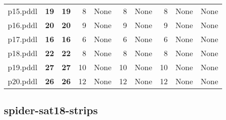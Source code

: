 \documentclass{article}
\begin{document}
\begin{tabular}{@{}lrrrrrrrrr@{}}
p15.pddl & \textbf{19} & \textbf{19} & 8 & \multicolumn{1}{|l|}{None} & 8 & \multicolumn{1}{|l|}{None} & 8 & \multicolumn{1}{|l|}{None} & \multicolumn{1}{|l|}{None} \\
p16.pddl & \textbf{20} & \textbf{20} & 9 & \multicolumn{1}{|l|}{None} & 9 & \multicolumn{1}{|l|}{None} & 9 & \multicolumn{1}{|l|}{None} & \multicolumn{1}{|l|}{None} \\
p17.pddl & \textbf{16} & \textbf{16} & 6 & \multicolumn{1}{|l|}{None} & 6 & \multicolumn{1}{|l|}{None} & 6 & \multicolumn{1}{|l|}{None} & \multicolumn{1}{|l|}{None} \\
p18.pddl & \textbf{22} & \textbf{22} & 8 & \multicolumn{1}{|l|}{None} & 8 & \multicolumn{1}{|l|}{None} & 8 & \multicolumn{1}{|l|}{None} & \multicolumn{1}{|l|}{None} \\
p19.pddl & \textbf{27} & \textbf{27} & 10 & \multicolumn{1}{|l|}{None} & 10 & \multicolumn{1}{|l|}{None} & 10 & \multicolumn{1}{|l|}{None} & \multicolumn{1}{|l|}{None} \\
p20.pddl & \textbf{26} & \textbf{26} & 12 & \multicolumn{1}{|l|}{None} & 12 & \multicolumn{1}{|l|}{None} & 12 & \multicolumn{1}{|l|}{None} & \multicolumn{1}{|l|}{None} \\
\end{tabular}

\hypertarget{initial_h_value-spider-sat18-strips}{}
\subsection*{spider-sat18-strips}
\end{document}
